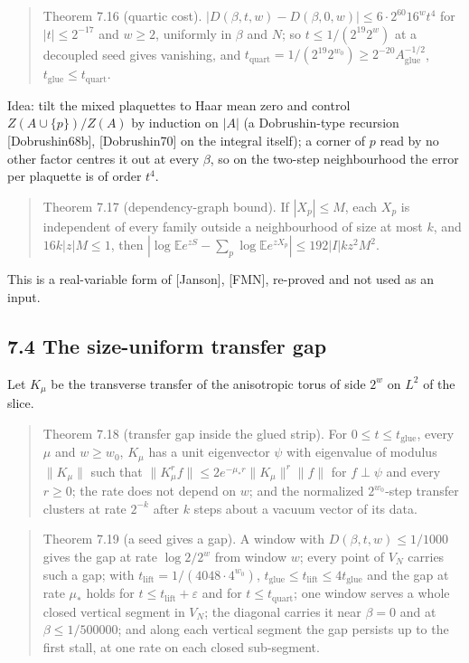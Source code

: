 \documentclass[10pt,letterpaper,twocolumn]{article}
\begin{document}
\begin{quote}
Theorem 7.16 (quartic cost). \(|D(\beta,t,w)-D(\beta,0,w)|\le6\cdot2^{60}16^wt^4\) for \(|t|\le2^{-17}\) and \(w\ge2\), uniformly in \(\beta\) and \(N\); so \(t\le1/(2^{19}2^w)\) at a decoupled seed gives vanishing, and \(t_{\mathrm{quart}}=1/(2^{19}2^{w_0})\ge2^{-20}A_{\mathrm{glue}}^{-1/2}\), \(t_{\mathrm{glue}}\le t_{\mathrm{quart}}\).
\end{quote}

Idea: tilt the mixed plaquettes to Haar mean zero and control \(Z(A\cup\{p\})/Z(A)\) by induction on \(|A|\) (a Dobrushin-type recursion {[}Dobrushin68b{]}, {[}Dobrushin70{]} on the integral itself); a corner of \(p\) read by no other factor centres it out at every \(\beta\), so on the two-step neighbourhood the error per plaquette is of order \(t^4\).

\begin{quote}
Theorem 7.17 (dependency-graph bound). If \(|X_p|\le M\), each \(X_p\) is independent of every family outside a neighbourhood of size at most \(k\), and \(16k|z|M\le1\), then \(|\log\mathbb Ee^{zS}-\sum_p\log\mathbb Ee^{zX_p}|\le192|I|kz^2M^2\).
\end{quote}

This is a real-variable form of {[}Janson{]}, {[}FMN{]}, re-proved and not used as an input.

\subsection{7.4 The size-uniform transfer gap}\label{74-the-size-uniform-transfer-gap}

Let \(K_\mu\) be the transverse transfer of the anisotropic torus of side \(2^w\) on \(L^2\) of the slice.

\begin{quote}
Theorem 7.18 (transfer gap inside the glued strip). For \(0\le t\le t_{\mathrm{glue}}\), every \(\mu\) and \(w\ge w_0\), \(K_\mu\) has a unit eigenvector \(\psi\) with eigenvalue of modulus \(\|K_\mu\|\) such that \(\|K_\mu^rf\|\le2e^{-\mu_\ast r}\|K_\mu\|^r\|f\|\) for \(f\perp\psi\) and every \(r\ge0\); the rate does not depend on \(w\); and the normalized \(2^{w_0}\)-step transfer clusters at rate \(2^{-k}\) after \(k\) steps about a vacuum vector of its data.
\end{quote}

\begin{quote}
Theorem 7.19 (a seed gives a gap). A window with \(D(\beta,t,w)\le1/1000\) gives the gap at rate \(\log2/2^w\) from window \(w\); every point of \(V_N\) carries such a gap; with \(t_{\mathrm{lift}}=1/(4048\cdot4^{w_0})\), \(t_{\mathrm{glue}}\le t_{\mathrm{lift}}\le4t_{\mathrm{glue}}\) and the gap at rate \(\mu_\ast\) holds for \(t\le t_{\mathrm{lift}}+\varepsilon\) and for \(t\le t_{\mathrm{quart}}\); one window serves a whole closed vertical segment in \(V_N\); the diagonal carries it near \(\beta=0\) and at \(\beta\le1/500000\); and along each vertical segment the gap persists up to the first stall, at one rate on each closed sub-segment.
\end{quote}
\end{document}
